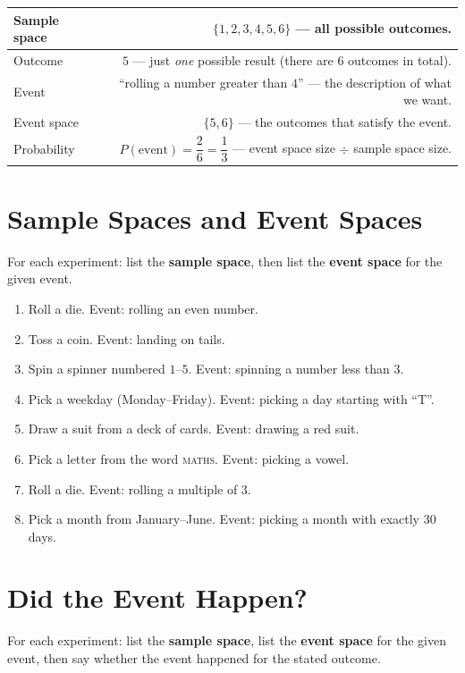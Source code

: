 \documentclass[11pt]{article}
\newcommand{\ans}{\hrulefill}
\newcommand{\anshere}{\par\vspace{0.4em}\noindent\ans\par\vspace{0.4em}}
\begin{document}
\vspace{0.3em}
\begin{center}
\begin{tabular}{|T|D|}
\hline
Sample space & $\{1,2,3,4,5,6\}$ --- all possible outcomes. \\\hline
Outcome & $5$ --- just \emph{one} possible result (there are $6$ outcomes in total). \\\hline
Event & ``rolling a number greater than $4$'' --- the description of what we want. \\\hline
Event space & $\{5,6\}$ --- the outcomes that satisfy the event. \\\hline
Probability & $P(\text{event}) = \dfrac{2}{6} = \dfrac{1}{3}$ --- event space size $\div$ sample
space size. \\\hline
\end{tabular}
\end{center}

\newpage

\section*{Sample Spaces and Event Spaces}
\noindent For each experiment: list the \textbf{sample space}, then list the \textbf{event
space} for the given event.

\begin{enumerate}[label=(\alph*)]
  \item Roll a die. Event: rolling an even number.
  \anshere
  \item Toss a coin. Event: landing on tails.
  \anshere
  \item Spin a spinner numbered $1$--$5$. Event: spinning a number less than $3$.
  \anshere
  \item Pick a weekday (Monday--Friday). Event: picking a day starting with ``T''.
  \anshere
  \item Draw a suit from a deck of cards. Event: drawing a red suit.
  \anshere
  \item Pick a letter from the word \textsc{maths}. Event: picking a vowel.
  \anshere
  \item Roll a die. Event: rolling a multiple of $3$.
  \anshere
  \item Pick a month from January--June. Event: picking a month with exactly $30$ days.
  \anshere
\end{enumerate}

\newpage

\section*{Did the Event Happen?}
\noindent For each experiment: list the \textbf{sample space}, list the \textbf{event space} for
the given event, then say whether the event happened for the stated outcome.
\end{document}
